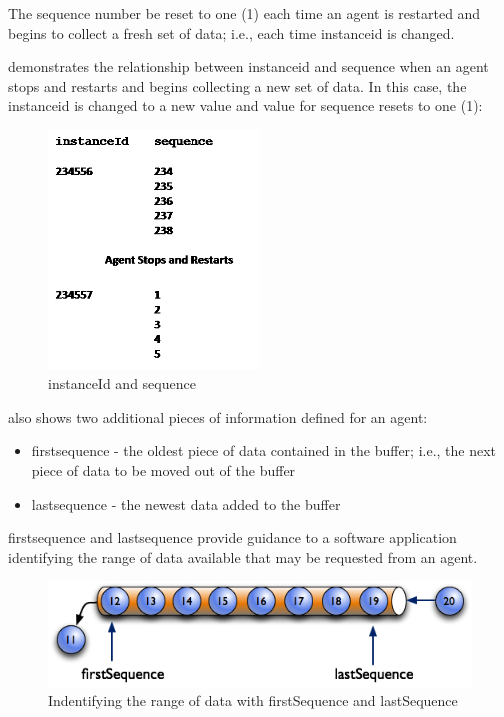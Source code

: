 \documentclass{mtconnect}	%
\begin{document}
The \gls{sequence number} \MUST be reset to one (1) each time an \gls{agent} is restarted and begins to collect a fresh set of data; i.e., each time \gls{instanceid} is changed.

 demonstrates the relationship between \gls{instanceid} and sequence when an \gls{agent} stops and restarts and begins collecting a new set of data.  In this case, the \gls{instanceid} is changed to a new value and value for \gls{sequence} resets to one (1):

\begin{figure}[ht]
  \centering
  \includegraphics[width=0.5\textwidth]{figures/instanceid-and-sequence.png}
  \caption{instanceId and sequence}
  \label{fig:instanceid-and-sequence}
\end{figure}

\FloatBarrier


 also shows two additional pieces of information defined for an \gls{agent}:

\begin{itemize}
\item \gls{firstsequence} - the oldest piece of data contained in the \gls{buffer}; i.e., the next piece of data to be moved out of the \gls{buffer}

\item \gls{lastsequence} - the newest data added to the \gls{buffer}
\end{itemize}

\gls{firstsequence} and \gls{lastsequence} provide guidance to a software application identifying the range of data available that may be requested from an \gls{agent}. 

\begin{figure}[ht]
  \centering
  \includegraphics[width=1.0\textwidth]{figures/identifying-the-range-of-data-with-firstsequence-and-lastsequence.png}
  \caption{Indentifying the range of data with firstSequence and lastSequence}
  \label{fig:identifying-the-range-of-data-with-firstsequence-and-lastsequence}
\end{figure}
\end{document}
